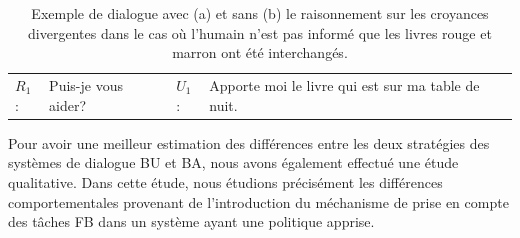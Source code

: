 \documentclass[a4paper,11pt,twoside]{StyleThese}
\begin{document}
\begin{table}
\centering
\scriptsize
  \begin{tabular}{llll}
  \hline
  $R_1$: & Puis-je vous aider? & $U_1$: & Apporte moi le livre qui est sur ma table de nuit.\\
\end{tabular}
  \vfill
  \qquad
  \caption{Exemple de dialogue avec (a) et sans (b) le raisonnement sur les croyances divergentes dans le cas où l'humain n'est pas informé que les livres rouge et marron ont été interchangés.
  }
 \label{table:qualitative-samples}
 \end{table}

Pour avoir une meilleur estimation des différences entre les deux stratégies des systèmes de dialogue BU et BA, nous avons également effectué une étude qualitative. Dans cette étude, nous étudions précisément les différences comportementales provenant de l'introduction du méchanisme de prise en compte des tâches FB dans un système ayant une politique apprise. 
\end{document}
